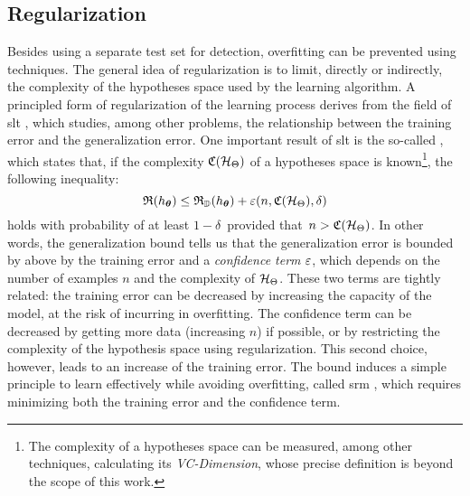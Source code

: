 \subsection{Regularization}
Besides using a separate test set for detection, overfitting can be prevented \apriori using  techniques. The general idea of regularization is to limit, directly or indirectly, the complexity of the hypotheses space used by the learning algorithm. A principled form of regularization of the learning process derives from the field of \gls{slt} \citep{vapnik2000slt}, which studies, among other problems, the relationship between the training error and the generalization error. One important result of \gls{slt} is the so-called , which states that, if the complexity $\Complexity(\HSpace)$ of a hypotheses space is known\footnote{The complexity of a hypotheses space can be measured, among other techniques, calculating its \emph{VC-Dimension}, whose precise definition is beyond the scope of this work.}, the following inequality:
$$\Risk(h_{\Param}) \leq \Risk_{\Data}(h_{\Param}) + \eps(n, \Complexity(\HSpace), \delta)$$
holds with probability of at least $1 - \delta\,$ provided that $\,n > \Complexity(\HSpace)$. In other words, the generalization bound tells us that the generalization error is bounded by above by the training error and a \emph{confidence term} $\varepsilon$, which depends on the number of examples $n$ and the complexity of $\HSpace$. These two terms are tightly related: the training error can be decreased by increasing the capacity of the model, at the risk of incurring in overfitting. The confidence term can be decreased by getting more data (increasing $n$) if possible, or by restricting the complexity of the hypothesis space using regularization. This second choice, however, leads to an increase of the training error. The bound induces a simple principle to learn effectively while avoiding overfitting, called \gls{srm} \citep{vapnik2000slt}, which requires minimizing both the training error and the confidence term.

